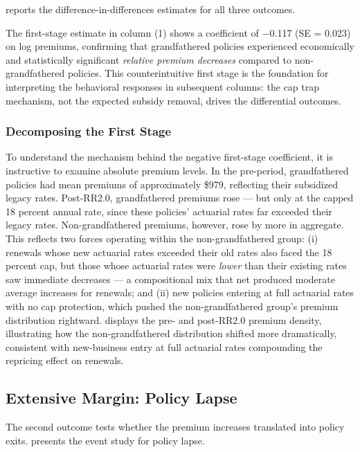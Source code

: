 \documentclass[12pt]{article}
\begin{document}
 reports the difference-in-differences estimates for all three outcomes.



The first-stage estimate in column (1) shows a coefficient of $-$0.117 (SE = 0.023) on log premiums, confirming that grandfathered policies experienced economically and statistically significant \textit{relative premium decreases} compared to non-grandfathered policies. This counterintuitive first stage is the foundation for interpreting the behavioral responses in subsequent columns: the cap trap mechanism, not the expected subsidy removal, drives the differential outcomes.

\subsubsection*{Decomposing the First Stage} To understand the mechanism behind the negative first-stage coefficient, it is instructive to examine absolute premium levels. In the pre-period, grandfathered policies had mean premiums of approximately \$979, reflecting their subsidized legacy rates. Post-RR2.0, grandfathered premiums rose --- but only at the capped 18 percent annual rate, since these policies' actuarial rates far exceeded their legacy rates. Non-grandfathered premiums, however, rose by more in aggregate. This reflects two forces operating within the non-grandfathered group: (i) renewals whose new actuarial rates exceeded their old rates also faced the 18 percent cap, but those whose actuarial rates were \textit{lower} than their existing rates saw immediate decreases --- a compositional mix that net produced moderate average increases for renewals; and (ii) new policies entering at full actuarial rates with no cap protection, which pushed the non-grandfathered group's premium distribution rightward.  displays the pre- and post-RR2.0 premium density, illustrating how the non-grandfathered distribution shifted more dramatically, consistent with new-business entry at full actuarial rates compounding the repricing effect on renewals.

\subsection{Extensive Margin: Policy Lapse}

The second outcome tests whether the premium increases translated into policy exits.  presents the event study for policy lapse.
\end{document}
